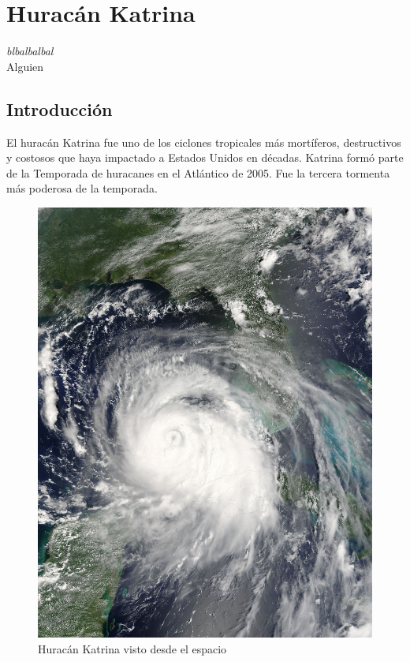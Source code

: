 \chapter{Huracán Katrina} \label{cap0b}

\begin{flushright}
\begin{minipage}{7.85cm}
    {\em blbalbalbal} \\ Alguien %
\end{minipage}
\end{flushright}

\vspace*{5mm}

\section{Introducción}

El huracán Katrina fue uno de los ciclones tropicales más mortíferos,
destructivos y costosos que haya impactado a Estados Unidos en décadas. Katrina
formó parte de la Temporada de huracanes en el Atlántico de 2005. Fue la tercera
tormenta más poderosa de la temporada.

\begin{figure}[H]
 \centering
 \includegraphics[width=120mm]{figuras/cap0/hurricane.png}
 \caption{Huracán Katrina visto desde el espacio}
\end{figure}


